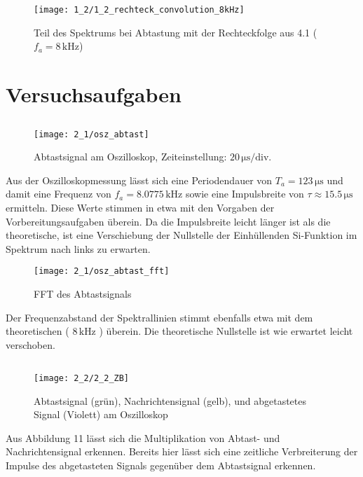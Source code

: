 \documentclass[a4paper, 12pt]{article}
\begin{document}
\begin{figure}[H]
	\texttt{[image: 1\_2/1\_2\_rechteck\_convolution\_8kHz]}
  \caption{Teil des Spektrums bei Abtastung mit der Rechteckfolge aus 4.1 ($f_a = 8 \,\si{\kilo\hertz}$)}
\end{figure}


\section{Versuchsaufgaben}

\subsection{}
\begin{figure}[H]
	\texttt{[image: 2\_1/osz\_abtast]}
  \caption{Abtastsignal am Oszilloskop, Zeiteinstellung: $20 \, \si{\micro\second}/\textrm{div.}$}
\end{figure}

Aus der Oszilloskopmessung lässt sich eine Periodendauer von $T_a = 123 \, \si{\micro\second}$ und damit
eine Frequenz von $f_a = 8.0775 \, \si{\kilo\hertz}$ sowie eine
Impulsbreite von $\tau \approx 15.5 \, \si{\micro\second}$ ermitteln. Diese Werte
stimmen in etwa mit den Vorgaben der Vorbereitungsaufgaben überein. Da die
Impulsbreite leicht länger ist als die theoretische, ist eine Verschiebung der
Nullstelle der Einhüllenden Si-Funktion im Spektrum nach links zu erwarten.

\begin{figure}[H]
	\texttt{[image: 2\_1/osz\_abtast\_fft]}
  \caption{FFT des Abtastsignals}
\end{figure}

Der Frequenzabstand der Spektrallinien stimmt ebenfalls etwa mit dem
theoretischen ( $8 \, \si{\kilo\hertz}$ ) überein. Die theoretische Nullstelle
ist wie erwartet leicht verschoben.

\subsection{}
\begin{figure}[H]
	\texttt{[image: 2\_2/2\_2\_ZB]}
  \caption{Abtastsignal (grün), Nachrichtensignal (gelb), und abgetastetes
    Signal (Violett) am Oszilloskop}
\end{figure}

Aus Abbildung 11 lässt sich die Multiplikation von Abtast- und Nachrichtensignal
erkennen. Bereits hier lässt sich eine zeitliche Verbreiterung der Impulse des
abgetasteten Signals gegenüber dem Abtastsignal erkennen. 
\end{document}
